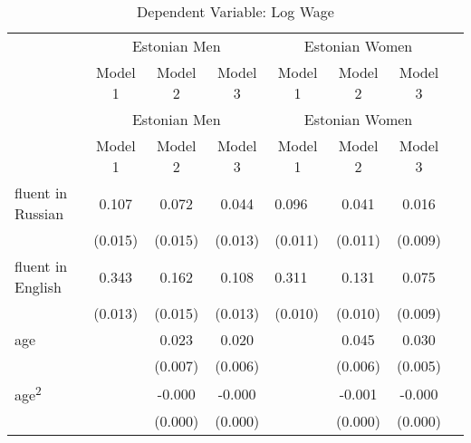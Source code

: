 

	\begin{longtable}{l*{3}{c}|l*{3}{c}}
		\caption{Dependent Variable: Log Wage}\\
		\toprule
		& \multicolumn{3}{c|}{Estonian Men} & \multicolumn{3}{c}{Estonian Women} \\
				&\multicolumn{1}{c}{Model 1}&\multicolumn{1}{c}{Model 2}&\multicolumn{1}{c|}{Model 3}&\multicolumn{1}{c}{Model 1}&\multicolumn{1}{c}{Model 2}&\multicolumn{1}{c}{Model 3}\\ 
				\midrule
		\endfirsthead
		\toprule
				& \multicolumn{3}{c|}{Estonian Men} & \multicolumn{3}{c}{Estonian Women} \\
		&\multicolumn{1}{c}{Model 1}&\multicolumn{1}{c}{Model 2}&\multicolumn{1}{c|}{Model 3}&\multicolumn{1}{c}{Model 1}&\multicolumn{1}{c}{Model 2}&\multicolumn{1}{c}{Model 3}\\
		\midrule
		\endhead
		\midrule
		\endfoot
		\bottomrule
		\endlastfoot
	fluent in Russian   &       0.107\sym{***}&       0.072\sym{***}&       0.044\sym{***}&       0.096\sym{***}&       0.041\sym{***}&       0.016\sym{*}  \\
	&     (0.015)         &     (0.015)         &     (0.013)         &     (0.011)         &     (0.011)         &     (0.009)         \\
	fluent in English   &       0.343\sym{***}&       0.162\sym{***}&       0.108\sym{***}&       0.311\sym{***}&       0.131\sym{***}&       0.075\sym{***}\\
	&     (0.013)         &     (0.015)         &     (0.013)         &     (0.010)         &     (0.010)         &     (0.009)         \\
	age                 &                     &       0.023\sym{***}&       0.020\sym{***}&                     &       0.045\sym{***}&       0.030\sym{***}\\
	&                     &     (0.007)         &     (0.006)         &                     &     (0.006)         &     (0.005)         \\
	age\textsuperscript{2}    &                     &      -0.000\sym{***}&      -0.000\sym{***}&                     &      -0.001\sym{***}&      -0.000\sym{***}\\
	&                     &     (0.000)         &     (0.000)         &                     &     (0.000)         &     (0.000)         \\

\end{longtable}
